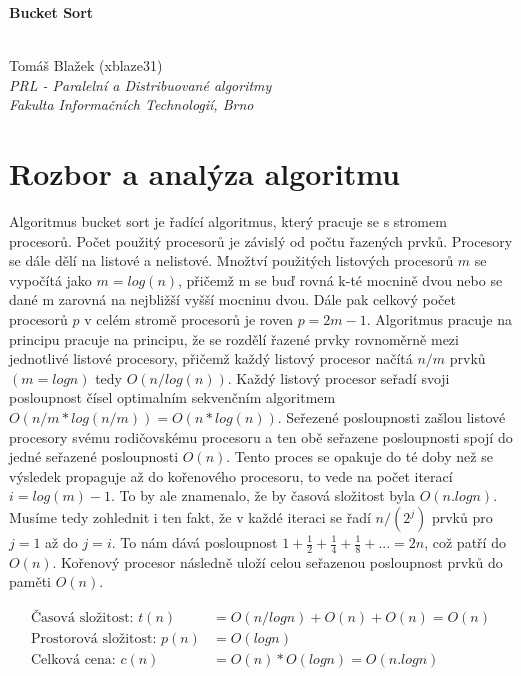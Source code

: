 \documentclass[12pt, a4paper]{article}
\begin{document}
\begin{center}
	\begin{huge}\textbf{Bucket Sort}\end{huge} \\
	\vspace{0.4cm}
	Tomáš Blažek (xblaze31) \\
	\textit{PRL - Paralelní a Distribuované algoritmy} \\
	\textit{Fakulta Informačních Technologií, Brno} \\
\end{center}



\section{Rozbor a analýza algoritmu}
\label{sec:rozbor}
Algoritmus bucket sort je řadící algoritmus, který pracuje se s stromem procesorů. Počet použitý procesorů je závislý od počtu řazených prvků. Procesory se dále dělí na listové a nelistové. Množtví použitých listových procesorů $m$ se vypočítá jako $m=log(n)$, přičemž m se buď rovná k-té mocnině dvou nebo se dané m zarovná na nejbližší vyšší mocninu dvou. Dále pak celkový počet procesorů $p$ v celém stromě procesorů je roven $p = 2m-1$. Algoritmus pracuje na principu pracuje na principu, že se rozdělí řazené prvky rovnoměrně mezi jednotlivé listové procesory, přičemž každý listový procesor načítá $n/m$ prvků $(m=log n)$ tedy $O(n/log(n))$. Každý listový procesor seřadí svoji posloupnost čísel optimalním sekvenčním algoritmem $O(n/m*log(n/m)) = O(n*log(n))$. Seřezené posloupnosti zašlou listové procesory svému rodičovskému procesoru a ten obě seřazene posloupnosti spojí do jedné seřazené posloupnosti $O(n)$. Tento proces se opakuje do té doby než se výsledek propaguje až do kořenového procesoru, to vede na počet iterací  $i = log(m)-1$. To by ale znamenalo, že by časová složitost byla $O(n.log n)$. Musíme tedy zohlednit i ten fakt, že v každé iteraci se řadí $n/(2^j)$ prvků pro $j = 1$ až do $j = i$. To nám dává posloupnost $1 + \frac{1}{2} + \frac{1}{4} +\frac{1}{8} + ... = 2n$, což patří do $O(n)$. Kořenový procesor následně uloží celou seřazenou posloupnost prvků do paměti $O(n)$. 


\begin{equation}
\begin{split}
\text{Časová složitost: }t(n) &= O(n/log n) + O(n) + O(n) = O(n)\\
\text{Prostorová složitost: }p(n) &= O(log n)\\
\text{Celková cena: }c(n) &= O(n) * O(log n) = O(n.log n)
\end{split}
\end{equation}
\end{document}
